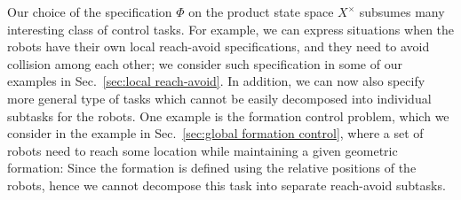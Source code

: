 Our choice of the specification $\Phi$ on the product state space $X^\times$ subsumes many interesting class of control tasks.
For example, we can express situations when the robots have their own local reach-avoid specifications, and they need to avoid collision among each other; we consider such specification in some of our examples in Sec.~\ref{sec:local reach-avoid}.
In addition, we can now also specify more general type of tasks which cannot be easily decomposed into individual subtasks for the robots.
One example is the formation control problem, which we consider in the example in Sec.~\ref{sec:global formation control}, where a set of robots need to reach some location while maintaining a given geometric formation:
Since the formation is defined using the relative positions of the robots, hence we cannot decompose this task into separate reach-avoid subtasks.

